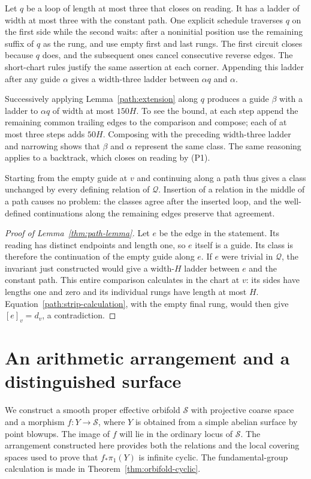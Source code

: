 \documentclass[11pt,reqno]{amsart}
\numberwithin{equation}{section}
\theoremstyle{definition}
\theoremstyle{remark}
\newcommand{\cS}{\mathcal S}
\begin{document}
Let $q$ be a loop of length at most three that closes on reading.
It has a ladder of width at most three with the constant path.  One
explicit schedule traverses $q$ on the first side while the second
waits: after a noninitial position use the remaining suffix of $q$ as
the rung, and use empty first and last rungs.  The first circuit closes
because $q$ does, and the subsequent ones cancel consecutive reverse
edges.  The short-chart rules justify the same assertion at each corner.
Appending this ladder after any guide $\alpha$ gives a width-three
ladder between $\alpha q$ and $\alpha$.

Successively applying Lemma~\ref{path:extension} along $q$ produces a
guide $\beta$ with a ladder to $\alpha q$ of width at most $150H$.
To see the bound, at each step append the remaining common trailing
edges to the comparison and compose; each of at most three steps adds
$50H$.  Composing with the preceding width-three ladder and narrowing
shows that $\beta$ and $\alpha$ represent the same class.  The same
reasoning applies to a backtrack, which closes on reading by (P1).

Starting from the empty guide at $v$ and continuing along a path thus
gives a class unchanged by every defining relation of $\mathcal Q$.
Insertion of a relation in the middle of a path causes no problem:
the classes agree after the inserted loop, and the well-defined
continuations along the remaining edges preserve that agreement.

\begin{proof}[Proof of Lemma~\ref{thm:path-lemma}]
Let $e$ be the edge in the statement.  Its reading has distinct
endpoints and length one, so $e$ itself is a guide.  Its class is
therefore the continuation of the empty guide along $e$.  If $e$ were
trivial in $\mathcal Q$, the invariant just constructed would give a
width-$H$ ladder between $e$ and the constant path.  This entire
comparison calculates in the chart at $v$: its sides have lengths one
and zero and its individual rungs have length at most $H$.
Equation~\eqref{path:strip-calculation}, with the empty final rung,
would then give $[e]_v=d_v$, a contradiction.
\end{proof}

\section{An arithmetic arrangement and a distinguished surface}\label{sec:geometry}

We construct a smooth proper effective orbifold $\cS$ with projective
coarse space and a morphism $f:Y\to\cS$, where $Y$ is obtained from a
simple abelian surface by point blowups.  The image of $f$ will lie in
the ordinary locus of $\cS$.  The arrangement constructed here provides
both the relations and the local covering spaces used to prove that
$f_*\pi_1(Y)$ is infinite cyclic.  The fundamental-group calculation is
made in Theorem~\ref{thm:orbifold-cyclic}.
\end{document}
